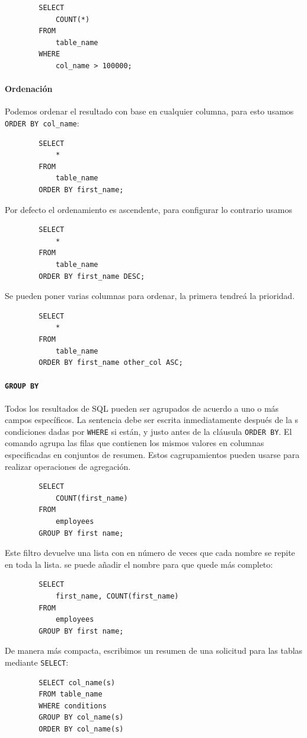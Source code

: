         \begin{verbatim}
        SELECT
            COUNT(*)
        FROM 
            table_name
        WHERE
            col_name > 100000;
        \end{verbatim}
        \paragraph{Ordenación} Podemos ordenar el resultado con base en cualquier columna, para esto usamos \texttt{ORDER BY col\_name}:

        \begin{verbatim}
        SELECT
            *
        FROM
            table_name
        ORDER BY first_name;
        \end{verbatim} 
        Por defecto el ordenamiento es ascendente, para configurar lo contrario usamos 

        \begin{verbatim}
        SELECT
            *
        FROM
            table_name
        ORDER BY first_name DESC;
        \end{verbatim} 
        Se pueden poner varias columnas para ordenar, la primera tendreá la prioridad.

        \begin{verbatim}
        SELECT
            *
        FROM
            table_name
        ORDER BY first_name other_col ASC;
        \end{verbatim}
        \paragraph{\texttt{GROUP BY}} Todos los resultados de SQL pueden ser agrupados de acuerdo a uno o más campos específicos. La sentencia debe ser escrita inmediatamente después de la s condiciones dadas por  \texttt{WHERE} si están, y justo antes de la cláusula \texttt{ORDER BY}. El comando agrupa las filas que contienen los mismos valores en columnas especificadas en conjuntos de resumen. Estos cagrupamientos pueden usarse para realizar operaciones de agregación.
        \begin{verbatim}
        SELECT
            COUNT(first_name)
        FROM
            employees
        GROUP BY first name;
        \end{verbatim}
        Este filtro devuelve una lista con en número de veces que cada nombre se repite en toda la lista. se puede añadir el nombre para que quede más completo:
        \begin{verbatim}
        SELECT
            first_name, COUNT(first_name)
        FROM
            employees
        GROUP BY first name;
        \end{verbatim}
        De manera más compacta, escribimos un resumen de una solicitud para las tablas mediante \texttt{SELECT}:
        \begin{verbatim}
        SELECT col_name(s)
        FROM table_name
        WHERE conditions
        GROUP BY col_name(s)
        ORDER BY col_name(s)
        \end{verbatim}
